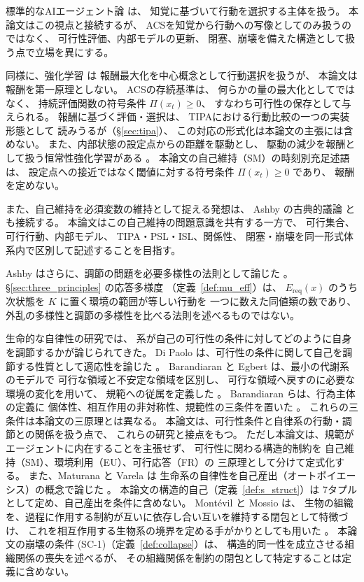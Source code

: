 標準的なAIエージェント論
\cite{RussellNorvig2020} は、
知覚に基づいて行動を選択する主体を扱う。
本論文はこの視点と接続するが、
ACSを知覚から行動への写像としてのみ扱うのではなく、
可行性評価、内部モデルの更新、
閉塞、崩壊を備えた構造として扱う点で立場を異にする。

同様に、強化学習 \cite{SuttonBarto2018} は
報酬最大化を中心概念として行動選択を扱うが、
本論文は報酬を第一原理としない。
ACSの存続基準は、
何らかの量の最大化としてではなく、
持続評価関数の符号条件
$\Pi(x_t)\ge0$、
すなわち可行性の保存として与えられる。
報酬に基づく評価・選択は、
TIPAにおける行動比較の一つの実装形態として
読みうるが（\S\ref{sec:tipa}）、
この対応の形式化は本論文の主張には含めない。
また、内部状態の設定点からの距離を駆動とし、
駆動の減少を報酬として扱う恒常性強化学習がある
\cite{KeramatiGutkin2014}。
本論文の自己維持（SM）の時刻別充足述語は、
設定点への接近ではなく閾値に対する符号条件 $\Pi(x_t)\ge0$ であり、
報酬を定めない。

また、自己維持を必須変数の維持として捉える発想は、
Ashby の古典的議論 \cite{Ashby1952} とも接続する。
本論文はこの自己維持の問題意識を共有する一方で、
可行集合、可行行動、内部モデル、
TIPA・PSL・ISL、関係性、
閉塞・崩壊を同一形式体系内で区別して記述することを目指す。

Ashby はさらに、調節の問題を必要多様性の法則として論じた
\cite{Ashby1956}。
\S\ref{sec:three_principles} の応答多様度
（定義~\ref{def:mu_eff}）は、
$E_{\mathrm{req}}(x)$ のうち次状態を $K$ に置く環境の範囲が等しい行動を
一つに数えた同値類の数であり、
外乱の多様性と調節の多様性を比べる法則を述べるものではない。

生命的な自律性の研究では、
系が自己の可行性の条件に対してどのように自身を調節するかが論じられてきた。
Di Paolo は、可行性の条件に関して自己を調節する性質として適応性を論じた
\cite{DiPaolo2005}。
Barandiaran と Egbert は、最小の代謝系のモデルで
可行な領域と不安定な領域を区別し、
可行な領域へ戻すのに必要な環境の変化を用いて、
規範への従属を定義した
\cite{BarandiaranEgbert2014}。
Barandiaran らは、行為主体の定義に
個体性、相互作用の非対称性、規範性の三条件を置いた
\cite{BarandiaranDiPaoloRohde2009}。
これらの三条件は本論文の三原理とは異なる。
本論文は、可行性条件と自律系の行動・調節との関係を扱う点で、
これらの研究と接点をもつ。
ただし本論文は、規範がエージェントに内在することを主張せず、
可行性に関わる構造的制約を
自己維持（SM）、環境利用（EU）、可行応答（FR）の
三原理として分けて定式化する。
また、Maturana と Varela は
生命系の自律性を自己産出（オートポイエーシス）の概念で論じた
\cite{MaturanaVarela1980}。
本論文の構造的自己（定義~\ref{def:s_struct}）は
7タプルとして定め、自己産出を条件に含めない。
Montévil と Mossio は、
生物の組織を、過程に作用する制約が互いに依存し合い互いを維持する閉包として特徴づけ、
これを相互作用する生物系の境界を定める手がかりとしても用いた
\cite{MontevilMossio2015}。
本論文の崩壊の条件 (SC-1)（定義~\ref{def:collapse}）は、
構造的同一性を成立させる組織関係の喪失を述べるが、
その組織関係を制約の閉包として特定することは定義に含めない。

